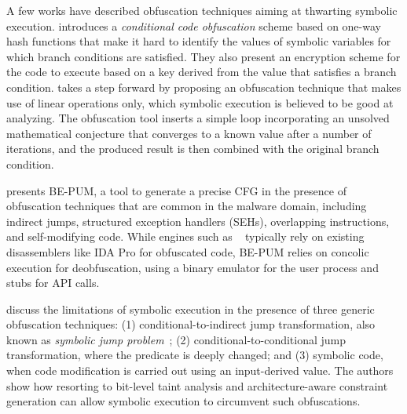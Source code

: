 A few works have described obfuscation techniques aiming at thwarting symbolic execution. \cite{SLG-NDSS08} introduces a {\em conditional code obfuscation} scheme based on one-way hash functions that make it hard to identify the values of symbolic variables for which branch conditions are satisfied. They also present an encryption scheme for the code to execute based on a key derived from the value that satisfies a branch condition. %
\cite{WMJ-ESORICS11} takes a step forward by proposing an obfuscation technique that makes use of linear operations only, which symbolic execution is believed to be good at analyzing. %
The obfuscation tool inserts a simple loop incorporating an unsolved mathematical conjecture that converges to a known value after a number of iterations, and the produced result is then combined with the original branch condition. %

\cite{HOT-FPS15} presents BE-PUM, a tool to generate a precise CFG in the presence of obfuscation techniques that are common in the malware domain, including indirect jumps, structured exception handlers (SEHs), overlapping instructions, and self-modifying code. While engines such as ~\cite{BITBLAZE-ICISS08} typically rely on existing disassemblers like IDA Pro for obfuscated code, BE-PUM relies on concolic execution for deobfuscation, using a binary emulator for the user process and stubs for API calls.

\cite{YD-CCS15} discuss the limitations of symbolic execution in the presence of three generic obfuscation techniques: (1) conditional-to-indirect jump transformation, also known as {\em symbolic jump problem}~\cite{SAB-SP10}; (2) conditional-to-conditional jump transformation, where the predicate is deeply changed; and (3) symbolic code, when code modification is carried out using an input-derived value. The authors show how resorting to bit-level taint analysis and architecture-aware constraint generation can allow symbolic execution to circumvent such obfuscations.